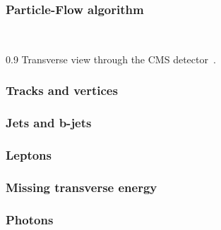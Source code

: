 \subsubsection{Particle-Flow algorithm}
~\cite{Sirunyan:2017ulk}

                 {0.9}       %
                 { Transverse view through the CMS detector~\cite{Sirunyan:2017ulk}. }

\subsubsection{Tracks and vertices}
\subsubsection{Jets and b-jets}
\subsubsection{Leptons}
\subsubsection{Missing transverse energy}
\subsubsection{Photons}

